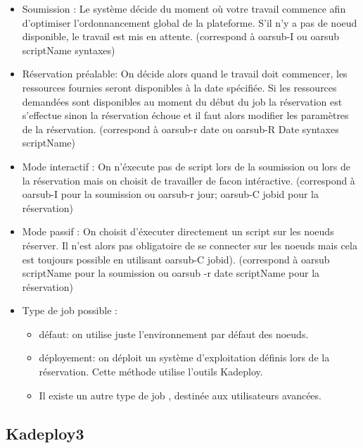 \documentclass[a4paper, 10pt, onecolumn]{report}
\begin{document}
			\begin{itemize}
				\item Soumission : Le système décide du moment où votre travail commence afin d'optimiser l'ordonnancement global de la plateforme. S'il n'y a pas de noeud disponible, le travail est mis en attente. (correspond à oarsub-I ou oarsub scriptName syntaxes)\\

				\item Réservation préalable: On décide alors quand le travail doit commencer, les ressources fournies seront disponibles à la date spécifiée. Si les ressources demandées sont disponibles au moment du début du job la réservation est s'effectue sinon la réservation échoue et il faut alors modifier les paramètres de la réservation. (correspond à oarsub-r date ou oarsub-R Date syntaxes scriptName)\\

				\item Mode interactif : On n'éxecute pas de script lors de la soumission ou lors de la réservation mais on choisit de travailler de facon intéractive. (correspond à oarsub-I pour la soumission ou oarsub-r jour; oarsub-C jobid pour la réservation)\\

				\item Mode passif : On choisit d'éxecuter directement un script sur les noeuds réserver. Il n'est alors pas obligatoire de se connecter sur les noeuds mais cela est toujours possible en utilisant oarsub-C jobid). (correspond à oarsub scriptName pour la soumission ou oarsub -r date scriptName pour la réservation)\\
				\item Type de job possible :  \\ \begin{itemize}
     											\item défaut: on utilise juste l'environnement par défaut des noeuds.
     											\item déployement: on déploit un système d'exploitation définis lors de la réservation. Cette méthode utilise l'outils Kadeploy.
     											\item Il existe un autre type de job , destinée aux utilisateurs avancées.
     										\end{itemize}
     		\end{itemize}
      			
		\subsection{Kadeploy3}
		
\end{document}
